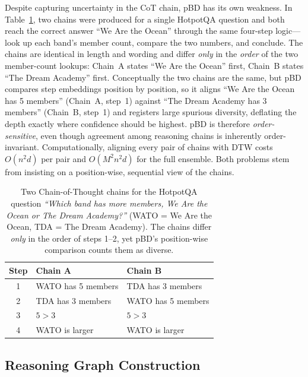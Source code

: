 \documentclass[twoside]{article}
\begin{document}
Despite capturing uncertainty in the CoT chain, pBD has its own weakness. In
Table~\ref{tab:ensemble-example}, two chains were produced for a single HotpotQA
question and both reach the correct answer ``We Are the Ocean'' through the same
four-step logic---look up each band's member count, compare the two numbers, and
conclude. The chains are identical in length and wording and differ \emph{only}
in the \emph{order} of the two member-count lookups: Chain~A states ``We Are the
Ocean'' first, Chain~B states ``The Dream Academy'' first. Conceptually the two
chains are the same, but pBD compares step embeddings position by position, so it
aligns ``We Are the Ocean has 5 members'' (Chain~A, step~1) against ``The Dream
Academy has 3 members'' (Chain~B, step~1) and registers large spurious diversity,
deflating the depth exactly where confidence should be highest. pBD is therefore
\emph{order-sensitive}, even though agreement among reasoning chains is inherently
order-invariant. Computationally, aligning every pair of chains with DTW costs
$O(n^2 d)$ per pair and $O(M^2 n^2 d)$ for the full ensemble. Both problems stem
from insisting on a position-wise, sequential view of the chains.

\begin{table}[t]
  \caption{Two Chain-of-Thought chains for the HotpotQA question
  \emph{``Which band has more members, We Are the Ocean or The Dream Academy?''}
  (WATO = We Are the Ocean, TDA = The Dream Academy). The chains differ
  \emph{only} in the order of steps 1--2, yet pBD's position-wise comparison counts
  them as diverse.}
  \label{tab:ensemble-example}
  \centering
  \footnotesize
  \setlength{\tabcolsep}{6pt}
  \begin{tabular}{c|ll}
    \toprule
    Step & \textbf{Chain A} & \textbf{Chain B} \\
    \midrule
    1 & WATO has 5 members & TDA has 3 members \\
    2 & TDA has 3 members  & WATO has 5 members \\
    3 & $5 > 3$            & $5 > 3$ \\
    4 & WATO is larger     & WATO is larger \\
    \bottomrule
  \end{tabular}
\end{table}

\subsection{Reasoning Graph Construction}
\label{sec:method:graph}
\end{document}
